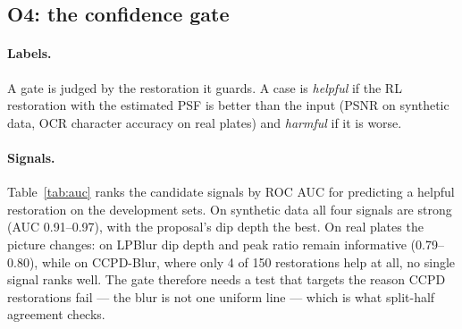 \subsection{O4: the confidence gate}
\label{sec:gateexp}
\paragraph{Labels.} A gate is judged by the restoration it guards. A case is \emph{helpful} if the
RL restoration with the estimated PSF is better than the input (PSNR on synthetic data, OCR
character accuracy on real plates) and \emph{harmful} if it is worse.

\paragraph{Signals.} Table~\ref{tab:auc} ranks the candidate signals by ROC AUC for predicting a
helpful restoration on the development sets. On synthetic data all four signals are strong
(AUC 0.91--0.97), with the proposal's dip depth the best. On real plates the picture changes:
on LPBlur dip depth and peak ratio remain informative (0.79--0.80), while on CCPD-Blur, where
only 4 of 150 restorations help at all, no single signal ranks well. The gate therefore needs a
test that targets the reason CCPD restorations fail --- the blur is not one uniform line --- which is
what split-half agreement checks.

\begin{table}[h]
\centering\small
{}
\caption{ROC AUC of each gate signal for ``the restoration will help'' (text-aware estimator, dev data).}
\label{tab:auc}
\end{table}

